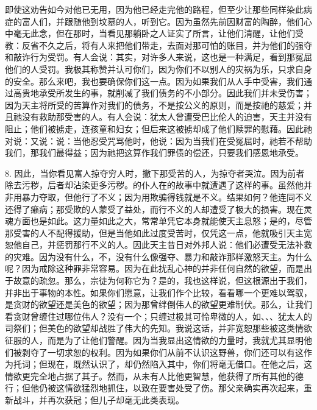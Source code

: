 即使这劝告如今对他已无用，因为他已经走完他的路程，但至少让那些同样染此病症的富人们，并跟随他到坟墓的人，听到它。因为虽然先前因财富的陶醉，他们心中毫无此念，但在那时，当看见那躺卧之人证实了所言，让他们清醒，让他们受教：反省不久之后，将有人来把他们带走，去面对那可怕的账目，并为他们的强夺和敲诈行为受罚。有人会说：其实，对许多人来说，这也是一种满足，看到那冤屈他们的人受罚。我极其称赞并认可你们，因为你们不以别人的灾祸为乐，只求自身的安全。那么来吧，我也要确保你们这一点。因为如果我们从人手中受害，我们通过高贵地承受所发生的事，就削减了我们债务的不小部分。因此我们并未受伤害；因为天主将所受的苦算作对我们的债务，不是按公义的原则，而是按祂的慈爱；并且祂没有救助那受害的人。有人会说：犹太人曾遭受巴比伦人的迫害，天主并没有阻止；他们被掳走，连孩童和妇女；但后来这被掳却成了他们赎罪的慰藉。因此祂对说：又说：说：当他忍受咒骂他时，他说：因为当我们在受冤屈时，祂若不帮助我们，那我们最得益；因为祂把这算作我们罪债的偿还，只要我们感恩地承受。\par

8. 因此，当你看见富人掠夺穷人时，撇下那受苦的人，为掠夺者哭泣。因为前者除去污秽，后者却沾染更多污秽。的仆人在的故事中就遭遇了这样的事。虽然他并非用暴力夺取，但他行了不义；因为用欺骗得钱就是不义。结果如何？他连同不义还得了癞病；那受欺的人蒙受了益处，而行不义的人却遭受了极大的损害。现在灵魂方面也是如此。这力量如此之大，常常单凭它本身就能使天主息怒；是的，尽管那受害的人不配得援助，但是当他如此过度受苦时，仅凭这一点，他就吸引天主宽恕他自己，并惩罚那行不义的人。因此天主昔日对外邦人说：他们必遭受无法补救的灾难。因为没有什么，不，没有什么像强夺、暴力和敲诈那样激怒天主。为什么呢？因为戒除这种罪非常容易。因为在此扰乱心神的并非任何自然的欲望，而是出于故意的疏忽。那么，宗徒为何称它为？是的，我也这样说，但这根源出于我们，并非出于事物的本性。如果你们愿意，让我们作个比较，看看哪一个更难以驾驭，是贪财的欲望还是美色的欲望；因为那曾绊倒伟人的欲望更难制伏。那么，让我们看贪财曾缠住过哪位伟人？没有一个；只缠过极其可怜卑微的人，如、、、犹太人的司祭们；但美色的欲望却战胜了伟大的先知。我说这话，并非宽恕那些被这类情欲征服的人，而是为了让他们警醒。因为当我显出这情欲的力量时，我就尤其显明他们被剥夺了一切求恕的权利。因为如果你们从前不认识这野兽，你们还可以有这作为托词；但现在，既然认识了，却仍然陷入其中，你们将毫无借口。在他之后，这情欲更完全地占据了其子。然而，从未有人比他更智慧，他获得了所有其他的德行；但他仍被这情欲猛烈地抓住，以致在要害处受了伤。那父亲确实再次起来，重新战斗，并再次获冠；但儿子却毫无此类表现。\par


